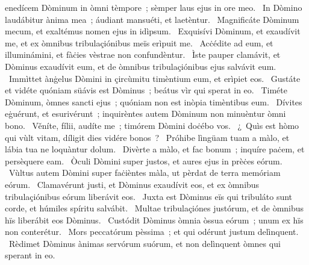 \psalmChapterWithInscription{}
{ }
{%
enedícem Dòminum in òmni tèmpore~; sèmper laus ejus in ore meo. 
~In Dòmino laudábitur ànima mea~; áudiant mansuéti, et laetèntur. 
~Magnificáte Dòminum mecum, et exaltémus nomen ejus in idìpsum. 
~Exquisívi Dòminum, et exaudívit me, et ex òmnibus tribulaçiónibus meïs erìpuit me. 
~Acċédite ad eum, et illuminámini, et fàċies vèstrae non confundèntur. 
~Ìste pauper clamávit, et Dòminus exaudívit eum, et de òmnibus tribulaçiónibus ejus salvávit eum. 
~Immìttet ànġelus Dòmini in çircùmitu timèntium eum, et erìpiet eos. 
~Gustáte et vidéte quóniam süávis est Dòminus~; beátus vìr qui sperat in eo. 
~Timéte Dòminum, òmnes sancti ejus~; quóniam non est inòpia timèntibus eum. 
~Dívites eġuérunt, et esurivérunt~; inquirèntes autem Dòminum non minuèntur òmni bono. 
~Věníte, fílii, audíte me~; timórem Dòmini doċébo vos. 
~¿~Quìs est hòmo qui vùlt vitam, díligit dies vidére bonos~? 
~Próhibe lìngüam tuam a màlo, et lábia tua ne loquàntur dolum. 
~Divèrte a màlo, et fac bonum~; inquíre paċem, et persèquere eam. 
~Òculi Dòmini super justos, et aures ejus in prèċes eórum. 
~Vùltus autem Dòmini super faċièntes màla, ut pèrdat de terra memóriam eórum. 
~Clamavérunt justi, et Dòminus exaudívit eos, et ex òmnibus tribulaçiónibus eórum liberávit eos. 
~Juxta est Dòminus eïs qui tribuláto sunt corde, et húmiles spíritu salvábit. 
~Multae tribulaçiónes justórum, et de òmnibus hïs liberábit eos Dòminus. 
~Custódit Dòminus òmnia òssua eórum~; unum ex hïs non conterétur. 
~Mors peccatórum pèssima~; et qui odérunt justum delìnquent. 
~Rèdimet Dòminus ànimas servórum suórum, et non delìnquent òmnes qui sperant in eo. 
}

